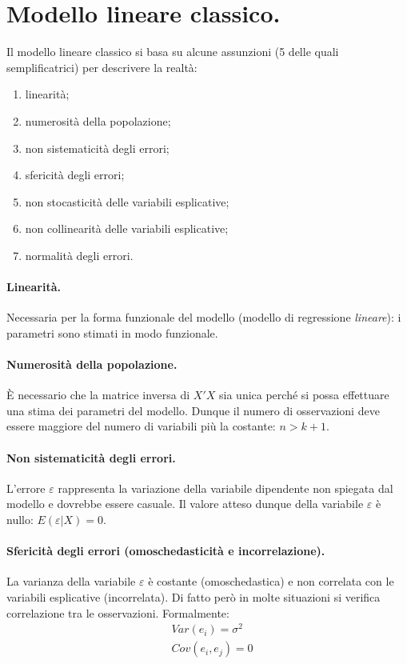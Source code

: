 \documentclass[11pt]{article}
\begin{document}
\section{Modello lineare classico.}
Il modello lineare classico si basa su alcune assunzioni (5 delle quali semplificatrici) per descrivere la realtà:
\begin{enumerate}
  \item linearità;
  \item numerosità della popolazione;
  \item non sistematicità degli errori;
  \item sfericità degli errori;
  \item non stocasticità delle variabili esplicative;
  \item non collinearità delle variabili esplicative;
  \item normalità degli errori.
\end{enumerate}

\paragraph{Linearità.}
Necessaria per la forma funzionale del modello (modello di regressione \textit{lineare}): i parametri sono stimati in modo funzionale.

\paragraph{Numerosità della popolazione.}
È necessario che la matrice inversa di $X'X$ sia unica perché si possa effettuare una stima dei parametri del modello.
Dunque il numero di osservazioni deve essere maggiore del numero di variabili più la costante: $n > k+1$.

\paragraph{Non sistematicità degli errori.}
L'errore $\varepsilon$ rappresenta la variazione della variabile dipendente non spiegata dal modello e dovrebbe essere casuale.
Il valore atteso dunque della variabile $\varepsilon$ è nullo: $E(\varepsilon|X) = 0$.

\paragraph{Sfericità degli errori (omoschedasticità e incorrelazione).}
La varianza della variabile $\varepsilon$ è costante (omoschedastica) e non correlata con le variabili esplicative (incorrelata).
Di fatto però in molte situazioni si verifica correlazione tra le osservazioni.
Formalmente:
\begin{align*}
  &Var(e_i) = \sigma^2 \\
  &Cov(e_i, e_j) = 0
\end{align*}
\end{document}
